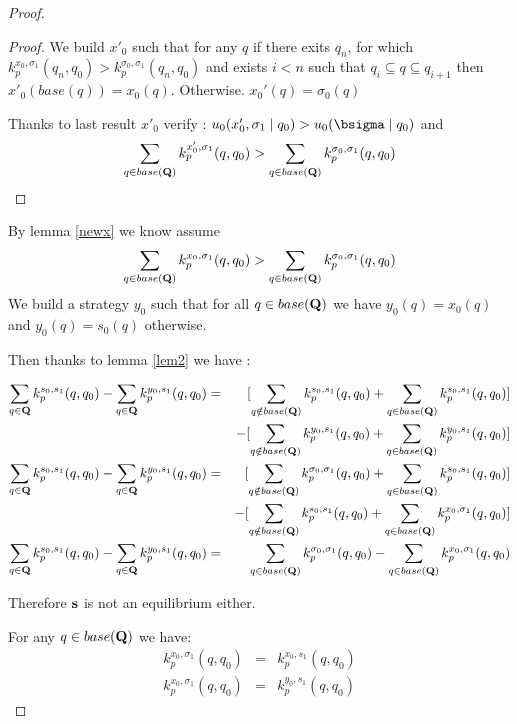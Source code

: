 \begin{proof}
\begin{proof}
We build $x'_0$ such that for any $q$ if there exits $q_n$, for which $k^{x_0,\sigma_1}_p(q_n,q_0) > k^{\sigma_0,\sigma_1}_p(q_n,q_0)$ and exists  $i < n $ such that $q_i \subseteq q \subseteq q_{i+1}$ then $x'_0(base(q)) = x_0(q)$. Otherwise. $x_0'(q) = \sigma_0(q)$ 

Thanks to last result $x'_0$ verify : $u_0(x_0',\sigma_1 \mid q_0) > u_0(\bsigma \mid q_0)$ and $$\sum_{q \in base(\mathbf{Q})} k^{x_0',\sigma_1}_p(q,q_0) >  \sum_{q \in base(\mathbf{Q})} k^{\sigma_0,\sigma_1}_p(q,q_0) $$


	\end{proof}
	
	By lemma \ref{newx} we know assume $$\sum_{q \in base(\mathbf{Q})} k^{x_0,\sigma_1}_p(q,q_0) >  \sum_{q \in base(\mathbf{Q})} k^{\sigma_0,\sigma_1}_p(q,q_0) $$
	We build a strategy $y_0$ such that for all $q \in base(\mathbf{Q})$ we have $y_0(q) = x_0(q)$ and $y_0(q) = s_0(q)$ otherwise.
	
	Then thanks to lemma \ref{lem2} we have :
	
	\begin{eqnarray*}
		\sum_{q \in \mathbf{Q}} k^{s_0,s_1}_p(q,q_0) - \sum_{q \in \mathbf{Q}} k^{y_0,s_1}_p(q,q_0) & = & [\sum_{q \notin base(\mathbf{Q})} k^{s_0,s_1}_p(q,q_0) + 	\sum_{q \in base(\mathbf{Q})} k^{s_0,s_1}_p(q,q_0)]\\
		 && - [\sum_{q \notin base(\mathbf{Q})} k^{y_0,s_1}_p(q,q_0) + \sum_{q \in base(\mathbf{Q})} k^{y_0,s_1}_p(q,q_0)]\\
		 \sum_{q \in \mathbf{Q}} k^{s_0,s_1}_p(q,q_0) - \sum_{q \in \mathbf{Q}} k^{y_0,s_1}_p(q,q_0) & = & [\sum_{q \notin base(\mathbf{Q})} k^{\sigma_0,\sigma_1}_p(q,q_0) + 	\sum_{q \in base(\mathbf{Q})} k^{s_0,s_1}_p(q,q_0)]\\
		 && - [\sum_{q \notin base(\mathbf{Q})} k^{s_0,s_1}_p(q,q_0) + \sum_{q \in base(\mathbf{Q})} k^{x_0,\sigma_1}_p(q,q_0)]\\
		 \sum_{q \in \mathbf{Q}} k^{s_0,s_1}_p(q,q_0) - \sum_{q \in \mathbf{Q}} k^{y_0,s_1}_p(q,q_0) & = & \sum_{q \in base(\mathbf{Q})} k^{\sigma_0,\sigma_1}_p(q,q_0) -\sum_{q \in base(\mathbf{Q})} k^{x_0,\sigma_1}_p(q,q_0) \\
	\end{eqnarray*}

Therefore $\mathbf{s}$ is not an equilibrium either.
	
	\iffalse

	For any $q \in base(\mathbf{Q})$ we have: 
	\begin{eqnarray*}
		k^{x_0,\sigma_1}_p(q,q_0) & =  &k^{x_0,s_1}_p(q,q_0) \\
		k^{x_0,\sigma_1}_p(q,q_0) & =  &k^{y_0,s_1}_p(q,q_0)
	\end{eqnarray*}
	

\end{proof}
